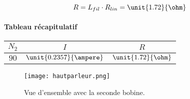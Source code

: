 $$R = L_{fil} \cdot R_{lin} = \unit{1.72}{\ohm}$$


\paragraph{Tableau récapitulatif}

\begin{center}
	\begin{tabular}{c|c|c}
		$N_2$ & $I$ & $R$ \\
		\hline
		 $90$ & $\unit{0.2357}{\ampere}$ & $\unit{1.72}{\ohm}$
	\end{tabular}
\end{center}

\begin{figure}[ht!]
\centering
\texttt{[image: hautparleur.png]}
\caption{Vue d'ensemble avec la seconde bobine.}
\label{overview_mobile_coil}
\end{figure}

